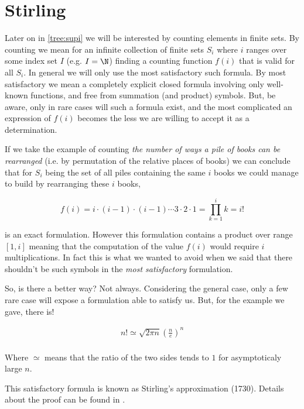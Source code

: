 \section{Stirling}
\label{tree:sorting:stirling}

Later on in \ref{tree:supi} we will be interested by counting elements in finite sets. By counting we mean for an infinite collection of finite sets $S_i$ where $i$ ranges over some index set $I$ (e.g. $I = \N$) finding a counting function $f(i)$ that is valid for all $S_i$. In general we will only use the most satisfactory such formula. By most satisfactory we mean a completely explicit closed formula involving only well-known functions, and free from summation (and product) symbols. But, be aware, only in rare cases will such a formula exist, and the most complicated an expression of $f(i)$ becomes the less we are willing to accept it as a determination. \cite{Stanley:2011:ECV:2124415}

If we take the example of counting \emph{the number of ways a pile of books can be rearranged} (i.e. by permutation of the relative places of books) we can conclude that for $S_i$ being the set of all piles containing the same $i$ books we could manage to build by rearranging these $i$ books,

$$ f(i) = i \cdot (i-1) \cdot (i-1) \cdots 3 \cdot 2 \cdot 1 = \prod_{k=1}^i k = i! $$

is an exact formulation. However this formulation contains a product over range $[1, i]$ meaning that the computation of the value $f(i)$ would require $i$ multiplications. In fact this is what we wanted to avoid when we said that there shouldn't be such symbols in the \emph{most satisfactory} formulation.

So, is there a better way? Not always. Considering the general case, only a few rare case will expose a formulation able to satisfy us. But, for the example we gave, there is!


\begin{theorem}
\label{tree:sorting:theorem/stirling}
\begin{align*}
n! \simeq \sqrt{2 \pi n} \left(\frac{n}{e}\right)^n\\
\end{align*}
\end{theorem}


Where $\simeq$ means that the ratio of the two sides tends to $1$ for asymptoticaly large $n$.

This satisfactory formula is known as Stirling's approximation (1730). Details about the proof can be found in \cite{feller1967direct}.

